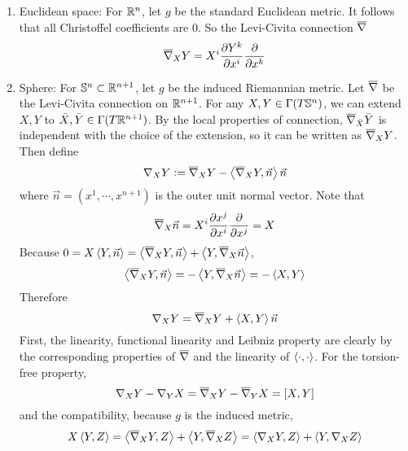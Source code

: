 \begin{enumerate}[label=\arabic{*}.]
	\begin{exam}
		\begin{enumerate}[label=(\arabic{*})]
			\item Euclidean space: For $\mathbb{R}^n$, let $g$ be the standard Euclidean metric. It follows that all Christoffel coefficients are $0$. So the Levi-Civita connection $\overline{\nabla}$
			\begin{equation*}
				\overline{\nabla}_XY = X^i\frac{\partial Y^k}{\partial x^i} \frac{\partial}{\partial x^k}
			\end{equation*}
			\item Sphere: For $\mathbb{S}^n \subset \mathbb{R}^{n+1}$, let $g$ be the induced Riemannian metric. Let $\overline{\nabla}$ be the Levi-Civita connection on $\mathbb{R}^{n+1}$. For any $X,Y \in \Gamma(T\mathbb{S}^n)$, we can extend $X,Y$ to $\bar{X},\bar{Y} \in \Gamma(T\mathbb{R}^{n+1})$. By the local properties of connection, $\overline{\nabla}_{\bar{X}}\bar{Y}$ is independent with the choice of the extension, so it can be written as $\overline{\nabla}_XY$. Then define
			\begin{equation*}
				\nabla_XY \vcentcolon= \overline{\nabla}_XY - \left\langle \overline{\nabla}_XY,\vec{n} \right\rangle\vec{n}
			\end{equation*}
			where $\vec{n} = (x^1,\cdots,x^{n+1})$ is the outer unit normal vector. Note that
			\begin{equation*}
				\overline{\nabla}_X\vec{n} = X^i\frac{\partial x^j}{\partial x^i} \frac{\partial}{\partial x^j} = X
			\end{equation*}
			Because $0 = X\left\langle Y,\vec{n} \right\rangle = \left\langle \overline{\nabla}_XY,\vec{n} \right\rangle + \left\langle Y,\overline{\nabla}_X\vec{n} \right\rangle$,
			\begin{equation*}
				\left\langle \overline{\nabla}_XY,\vec{n} \right\rangle =- \left\langle Y,\overline{\nabla}_X\vec{n} \right\rangle = -\left\langle X,Y \right\rangle
			\end{equation*}
			Therefore
			\begin{equation*}
				\nabla_XY = \overline{\nabla}_XY + \left\langle X,Y \right\rangle\vec{n}
			\end{equation*}
			First, the linearity, functional linearity and Leibniz property are clearly by the corresponding properties of $\overline{\nabla}$ and the linearity of $\left\langle \cdot,\cdot \right\rangle$. For the torsion-free property,
			\begin{equation*}
				\nabla_XY - \nabla_YX = \overline{\nabla}_XY - \overline{\nabla}_YX = [X,Y]
			\end{equation*}
			and the compatibility, because $g$ is the induced metric,
			\begin{equation*}
				X\inn{Y,Z} = \inn{\clo{\nabla}_XY,Z} + \inn{Y,\clo{\nabla}_XZ} = \inn{{\nabla}_XY,Z} + \inn{Y,{\nabla}_XZ}

\end{equation*}
\end{enumerate}
\end{exam}
\end{enumerate}
